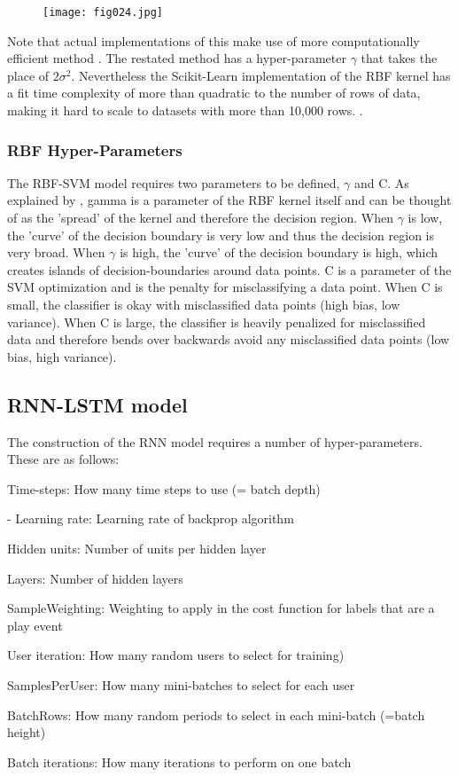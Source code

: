 \begin{figure}[h!]
	\centering
	\texttt{[image: fig024.jpg]}
	\caption{}
	\label{fig024}
\end{figure} 

Note that actual implementations of this make use of more computationally efficient method \parencite{TFCookbook}. The restated method has a hyper-parameter $\gamma$ that takes the place of $2\sigma^2$. Nevertheless the Scikit-Learn implementation of the RBF kernel has a fit time complexity of more than quadratic to the number of rows of data, making it hard to scale to datasets with more than 10,000 rows. \parencite{chang2011libsvm}.

\subsubsection{RBF Hyper-Parameters}
The RBF-SVM model requires two parameters to be defined, $\gamma$ and C. As explained by \parencite{albon},
gamma is a parameter of the RBF kernel itself and can be thought of as the 'spread' of the kernel and therefore the decision region. When $\gamma$ is low, the 'curve' of the decision boundary is very low and thus the decision region is very broad. When $\gamma$ is high, the 'curve' of the decision boundary is high, which creates islands of decision-boundaries around data points. 
C is a parameter of the SVM optimization and is the penalty for misclassifying a data point. When C is small, the classifier is okay with misclassified data points (high bias, low variance). When C is large, the classifier is heavily penalized for misclassified data and therefore bends over backwards avoid any misclassified data points (low bias, high variance).

\subsection{RNN-LSTM model}

The construction of the RNN model requires a number of hyper-parameters. These are as follows:

\begin{list}{-}
\item Time-steps: How many time steps to use (= batch depth)
\item - Learning rate: Learning rate of backprop algorithm
\item Hidden units: Number of units per hidden layer
	\item Layers: Number of hidden layers
	\item SampleWeighting: Weighting to apply in the cost function for labels that are a play event
	\item User iteration: How many random users to select for training)
	\item SamplesPerUser: How many mini-batches to select for each user
	\item BatchRows: How many random periods to select in each mini-batch (=batch height)
	\item Batch iterations: How many iterations to perform on one batch
\end{list}

